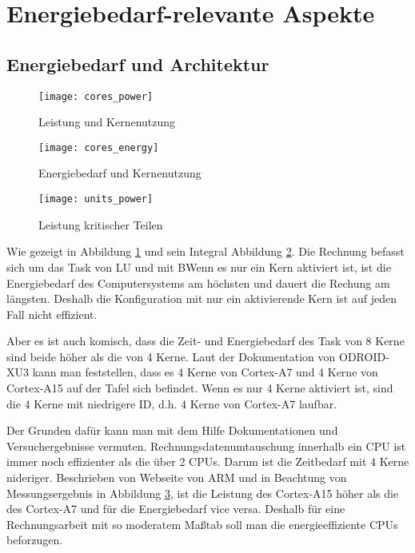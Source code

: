 \section{Energiebedarf-relevante Aspekte}
\label{sec:Energiebedarf-relevante Aspekte}

\subsection{Energiebedarf und Architektur}
\label{subsec:Energiebedarf und Architektur}

\begin{figure}[ht]
\texttt{[image: cores\_power]}
\caption[Leistung und Kernenutzung]{Leistung und Kernenutzung}
\label{fig:Leistung und Kernenutzung}
\end{figure}

\begin{figure}[ht]
\texttt{[image: cores\_energy]}
\caption[Energiebedarf und Kernenutzung]{Energiebedarf und Kernenutzung}
\label{fig:Energiebedarf und Kernenutzung}
\end{figure}

\begin{figure}[ht]
\texttt{[image: units\_power]}
\caption[Leistung kritischer Teilen]{Leistung kritischer Teilen}
\label{fig:Leistung kritischer Teilen}
\end{figure}

Wie gezeigt in Abbildung \ref{fig:Leistung und Kernenutzung} und sein Integral Abbildung \ref{fig:Energiebedarf und Kernenutzung}. Die Rechnung befasst sich um das Task von LU und mit BWenn es nur ein Kern aktiviert ist, ist die Energiebedarf des Computersystems am höchsten und dauert die Rechung am längsten. Deshalb die Konfiguration mit nur ein aktivierende Kern ist auf jeden Fall nicht effizient. 

Aber es ist auch komisch, dass die Zeit- und Energiebedarf des Task von 8 Kerne sind beide höher als die von 4 Kerne. Laut der Dokumentation von ODROID-XU3 kann man feststellen, dass es 4 Kerne von Cortex-A7 und 4 Kerne von Cortex-A15 auf der Tafel sich befindet. Wenn es nur 4 Kerne aktiviert ist, sind die 4 Kerne mit niedrigere ID, d.h. 4 Kerne von Cortex-A7 laufbar. 

Der Grunden dafür kann man mit dem Hilfe Dokumentationen und Versuchergebnisse vermuten. Rechnungsdatenumtauschung innerhalb ein CPU ist immer noch effizienter als die über 2 CPUs. Darum ist die Zeitbedarf mit 4 Kerne nideriger. Beschrieben von Webseite von ARM und in Beachtung von Messungsergebnis in Abbildung \ref{fig:Leistung kritischer Teilen}, ist die Leistung des Cortex-A15 höher als die des Cortex-A7 und für die Energiebedarf vice versa. Deshalb für eine Rechnungsarbeit mit so moderatem Maßtab soll man die energieeffiziente CPUs beforzugen.

